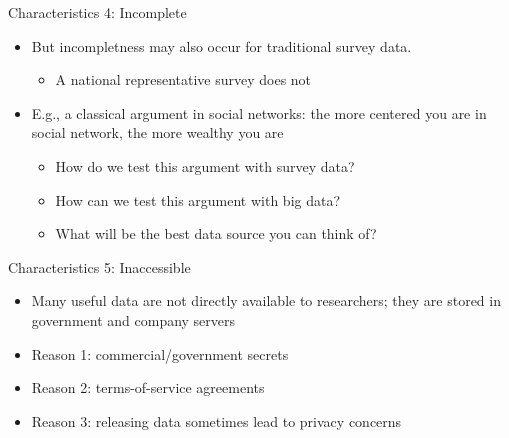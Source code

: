 \documentclass[handout]{beamer}
\begin{document}
\begin{frame}[label={h:bd21439d-870e-4aae-9ff3-20c0302dc137}]{Characteristics 4: Incomplete}
\begin{itemize}
\item But incompletness may also occur for traditional survey data. 
\begin{itemize}
\item A national representative survey does not
\end{itemize}
\item{} E.g., a classical argument in social networks: the more centered you are in social network, the more wealthy you are
\begin{itemize}
\item How do we test this argument with survey data?
\item How can we test this argument with big data?
\item What will be the best data source you can think of?
\end{itemize}
\end{itemize}
\end{frame}

\begin{frame}[label={h:87430be5-e71e-4157-8edc-a4dd60207be0}]{Characteristics 5: Inaccessible}
\begin{itemize}
\item Many useful data are not directly available to researchers; they are stored in government and company servers
\item Reason 1: commercial/government secrets
\item Reason 2: terms-of-service agreements
\item Reason 3: releasing data sometimes lead to privacy concerns
\end{itemize}
\end{frame}
\end{document}
